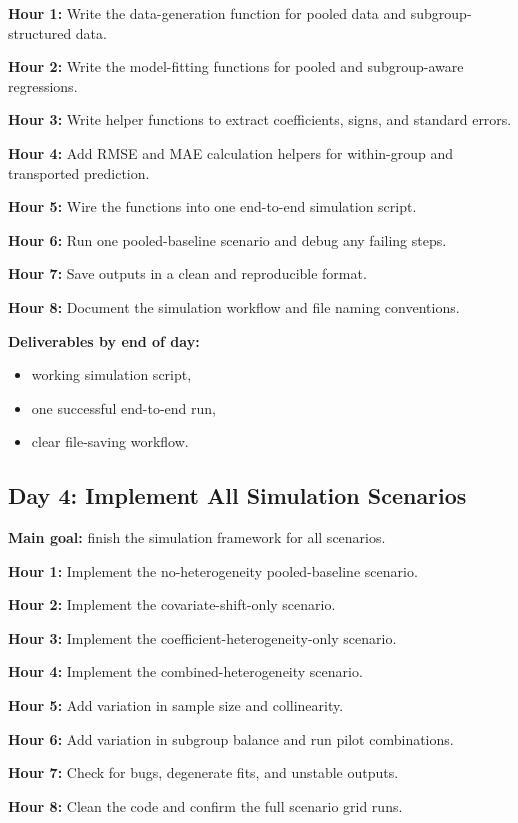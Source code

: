\documentclass[11pt]{article}
\begin{document}
\textbf{Hour 1:} Write the data-generation function for pooled data and subgroup-structured data.

\textbf{Hour 2:} Write the model-fitting functions for pooled and subgroup-aware regressions.

\textbf{Hour 3:} Write helper functions to extract coefficients, signs, and standard errors.

\textbf{Hour 4:} Add RMSE and MAE calculation helpers for within-group and transported prediction.

\textbf{Hour 5:} Wire the functions into one end-to-end simulation script.

\textbf{Hour 6:} Run one pooled-baseline scenario and debug any failing steps.

\textbf{Hour 7:} Save outputs in a clean and reproducible format.

\textbf{Hour 8:} Document the simulation workflow and file naming conventions.

\textbf{Deliverables by end of day:}
\begin{itemize}
    \item working simulation script,
    \item one successful end-to-end run,
    \item clear file-saving workflow.
\end{itemize}

\subsection*{Day 4: Implement All Simulation Scenarios}
\textbf{Main goal:} finish the simulation framework for all scenarios.

\textbf{Hour 1:} Implement the no-heterogeneity pooled-baseline scenario.

\textbf{Hour 2:} Implement the covariate-shift-only scenario.

\textbf{Hour 3:} Implement the coefficient-heterogeneity-only scenario.

\textbf{Hour 4:} Implement the combined-heterogeneity scenario.

\textbf{Hour 5:} Add variation in sample size and collinearity.

\textbf{Hour 6:} Add variation in subgroup balance and run pilot combinations.

\textbf{Hour 7:} Check for bugs, degenerate fits, and unstable outputs.

\textbf{Hour 8:} Clean the code and confirm the full scenario grid runs.
\end{document}
